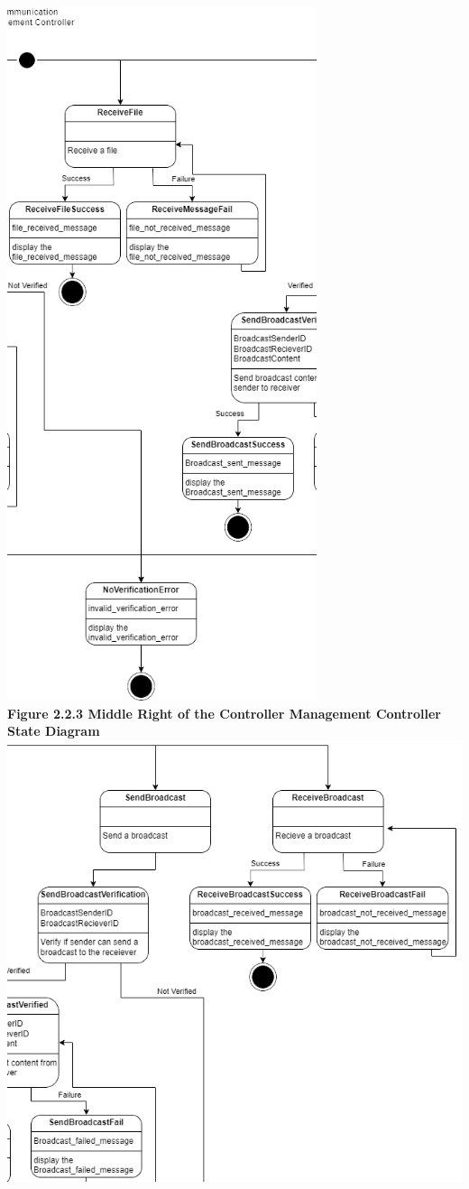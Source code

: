 \documentclass[]{article}
\begin{document}
\begin{center}
	\includegraphics[height=8in]{../images/ControllerStateDiagrams/CMC3.png}\\
	\textbf{Figure 2.2.3 Middle Right of the Controller Management Controller State Diagram}
	\includegraphics{../images/ControllerStateDiagrams/CMC4.png}\\

\end{center}
\end{document}
